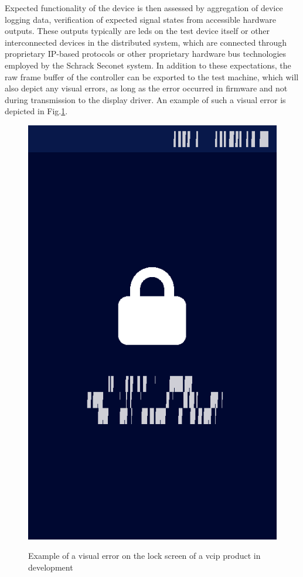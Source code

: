 \documentclass[Bachelor, BIC, english, fhCitStyle, IEEE]{BASE/twbook} %
\begin{document}
Expected functionality of the device is then assessed by aggregation of device logging data, verification of expected signal states from accessible hardware outputs. These outputs typically are \acp{led} on the test device itself or other interconnected devices in the distributed system, which are connected through proprietary IP-based protocols or other proprietary hardware bus technologies employed by the Schrack Seconet system. In addition to these expectations, the raw frame buffer of the controller can be exported to the test machine, which will also depict any visual errors, as long as the error occurred in firmware and not during transmission to the display driver. An example of such a visual error is depicted in Fig.\ref{fig:visual-error-example-screendump}.
\begin{figure}
    \caption{Example of a visual error on the lock screen of a \ac{vcip} product in development}
    \centering
    \includegraphics[height=0.25\textheight]{screen_dump_error.png}
    \label{fig:visual-error-example-screendump}
\end{figure}
\end{document}
